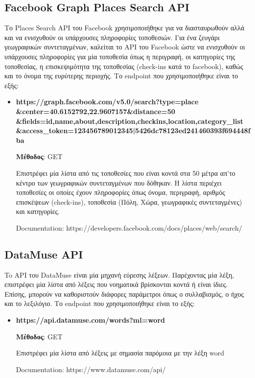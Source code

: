 \documentclass[oneside, 12pt]{book}
\begin{document}
\subsection{Facebook Graph Places Search API}\label{sec:facebook_graph_places_api}
Το Places Search API του Facebook χρησιμοποιήθηκε για να διασταυρωθούν 
αλλά και να ενισχυθούν οι υπάρχουσες πληροφορίες τοποθεσιών.
Για ένα ζευγάρι γεωγραφικών συντεταγμένων, καλείται το API του 
Facebook ώστε να ενισχυθούν οι υπάρχουσες πληροφορίες για μία 
τοποθεσία όπως η περιγραφή, οι κατηγορίες της τοποθεσίας, η 
επισκεψιμότητα της τοποθεσίας (check-ins κατά το facebook), καθώς και το όνομα της ευρύτερης περιοχής. 
Το endpoint που χρησιμοποιήθηκε είναι το εξής:
\begin{itemize}
    \item \textbf{https://graph.facebook.com/v5.0/search?type=place\\\&center=40.6152792,22.9607157\&distance=50\\\&fields=id,name,about,description,checkins,location,category\_list\\\&access\_token=123456789012345|5426dc78123ed241460393f694448fba}
    
    \textbf{Μέθοδος}: GET
    
    Επιστρέφει μία λίστα από τις τοποθεσίες που είναι κοντά στα 50 
    μέτρα απ'το κέντρο των γεωγραφικών συντεταγμένων που δόθηκαν.
    Η λίστα περιέχει τοποθεσίες οι οποίες έχουν πληροφορίες όπως 
    όνομα, περιγραφή, αριθμός επισκέψεων (check-ins), τοποθεσία (Πόλη, 
    Χώρα, γεωγραφικές συντεταγμένες) και κατηγορίες.
    
    Documentation: https://developers.facebook.com/docs/places/web/search/
\end{itemize}
 
\subsection{DataMuse API}\label{sec:datamuse_api_call}
To API του DataMuse είναι μία μηχανή εύρεσης λέξεων. Παρέχοντας μία 
λέξη, επιστρέφει μία λίστα από λέξεις που νοηματικά βρίσκονται κοντά ή 
είναι ίδιες. Επίσης, μπορούν να καθοριστούν διάφορες παράμετροι όπως ο 
συλλαβισμός, ο ήχος και το λεξιλόγιο. 
Το endpoint που χρησιμοποιήθηκε είναι το εξής:
\begin{itemize}
    \item \textbf{https://api.datamuse.com/words?ml={word}} 
    
    \textbf{Μέθοδος}: GET
    
    Επιστρέφει μία λίστα από λέξεις με σημασία παρόμοια με την λέξη {word}
    
    Documentation: https://www.datamuse.com/api/
\end{itemize}
\end{document}
